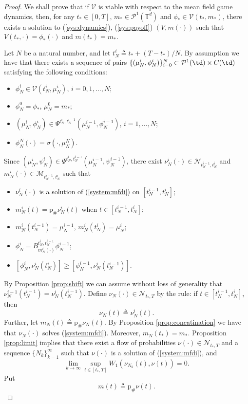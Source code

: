 \documentclass[a4paper,12pt]{article}
\newcommand{\ptd}{\mathcal{P}^1(\mathbb{T}^d)}
\begin{document}
\begin{proof}%
	We shall prove that if $\mathcal{V}$ is viable with respect to the mean field game dynamics, then, for any $t_*\in [0,T]$, $m_*\in\ptd$ and $\phi_*\in\mathcal{V}(t_*,m_*)$, there exists a  solution to (\ref{sys:dynamics}), (\ref{sys:payoff}) $(V,m(\cdot))$ such that $V(t_*,\cdot)=\phi_*(\cdot)$ and $m(t_*)=m_*$.
	
	Let $N$ be a natural number, and let $t^i_N\triangleq t_*+(T-t_*)/N$. By assumption we have that there exists a sequence of pairs $\{(\mu_N^i,\phi_N^i)\}_{i=0}^N\subset \mathcal{P}^1(\td)\times C(\td)$ satisfying the following conditions:
	\begin{itemize}
		\item $\phi^i_N\in\mathcal{V}(t_N^i,\mu_N^i)$, $i=0,1,\ldots,N$;
		\item $\phi^0_N=\phi_*$, $\mu^0_N=m_*$;
		\item $(\mu_N^i,\phi_N^{i})\in \Psi^{t_N^i,t_N^{i-1}}(\mu_N^{i-1},\phi_N^{i-1})$, $i=1,\ldots,N$;
		\item $\phi_N^N(\cdot)=\sigma(\cdot,\mu_N^N)$.
	\end{itemize} 
	Since $(\mu_N^i,\psi_N^i)\in\Psi^{t_N^i,t_N^{i-1}}(\mu_N^{i-1},\psi_N^{i-1})$, there exist $\nu^i_N(\cdot)\in\mathcal{N}_{t_N^{i-1},t_N^i}$ and $m^i_N(\cdot)\in\mathcal{M}_{t_N^{i-1},t_N^i}$  such that
	\begin{itemize}
		\item $\nu_N^i(\cdot)$ is a solution of (\ref{system:mfdi}) on $[t^{i-1}_N,t^i_N]$;
		\item $m_N^i(t)=\mathrm{p}_\#\nu_N^i(t)$ when $t\in [t^{i-1}_N,t^i_N]$;
		\item $m_N^i(t_N^{i-1})=\mu_N^{i-1}$, $m_N^i(t_N^i)=\mu_N^i$;
		\item $\phi_N^i=B^{t_N^i,t_N^{i-1}}_{m_N^i(\cdot)}\phi_N^{i-1}$;
		\item $[\phi^i_N,\nu_N^i(t_N^i)]\geq [\phi^{i-1}_N,\nu_N^i(t_N^{i-1})]$.
	\end{itemize}
	By Proposition \ref{prop:shift} we can assume without loss of generality that $\nu_N^{i-1}(t_N^{i-1})=\nu_N^{i}(t_N^{i-1})$. Define $\nu_N(\cdot)\in \mathcal{N}_{t_*,T}$ by the rule: if $t\in [t_N^{i-1},t_N^i]$, then
	$$\nu_N(t)\triangleq \nu_N^i(t). $$  Further, let $m_N(t)\triangleq \mathrm{p}_\#\nu_N(t)$.  By Proposition \ref{prop:concatination} we have that $\nu_N(\cdot)$ solves (\ref{system:mfdi}). Moreover,  $m_N(t_*)=m_*$.  Proposition \ref{prop:limit} implies that there exist a flow of probabilities $\nu(\cdot)\in \mathcal{N}_{t_*,T}$ and a sequence $\{N_k\}_{k=1}^\infty$ such that
	$\nu(\cdot)$ is a solution of (\ref{system:mfdi}), and $$\lim_{k\rightarrow\infty}\sup_{t\in [t_*,T]}W_1(\nu_{N_k}(t),\nu(t))=0. $$ Put \begin{equation}\label{intro:m_limit}
	m(t)\triangleq \mathrm{p}_\#\nu(t).
	\end{equation} 
	

\end{proof}
\end{document}
